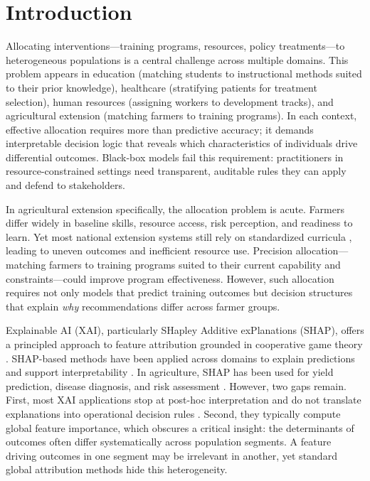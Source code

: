 \documentclass[3p,twocolumn,authoryear]{elsarticle}
\begin{document}

\section{Introduction}

Allocating interventions---training programs, resources, policy treatments---to heterogeneous populations is a central challenge across multiple domains. This problem appears in education (matching students to instructional methods suited to their prior knowledge), healthcare (stratifying patients for treatment selection), human resources (assigning workers to development tracks), and agricultural extension (matching farmers to training programs). In each context, effective allocation requires more than predictive accuracy; it demands interpretable decision logic that reveals which characteristics of individuals drive differential outcomes. Black-box models fail this requirement: practitioners in resource-constrained settings need transparent, auditable rules they can apply and defend to stakeholders.

In agricultural extension specifically, the allocation problem is acute. Farmers differ widely in baseline skills, resource access, risk perception, and readiness to learn. Yet most national extension systems still rely on standardized curricula \citep{anderson2004,feder1985}, leading to uneven outcomes and inefficient resource use. Precision allocation---matching farmers to training programs suited to their current capability and constraints---could improve program effectiveness. However, such allocation requires not only models that predict training outcomes but decision structures that explain \textit{why} recommendations differ across farmer groups.

Explainable AI (XAI), particularly SHapley Additive exPlanations (SHAP), offers a principled approach to feature attribution grounded in cooperative game theory \citep{lundberg2017}. SHAP-based methods have been applied across domains to explain predictions and support interpretability \citep{arrieta2020,lundberg2020}. In agriculture, SHAP has been used for yield prediction, disease diagnosis, and risk assessment \citep{ghosal2018,ryo2022}. However, two gaps remain. First, most XAI applications stop at post-hoc interpretation and do not translate explanations into operational decision rules \citep{ryo2022,linardatos2021}. Second, they typically compute global feature importance, which obscures a critical insight: the determinants of outcomes often differ systematically across population segments. A feature driving outcomes in one segment may be irrelevant in another, yet standard global attribution methods hide this heterogeneity.
\end{document}
